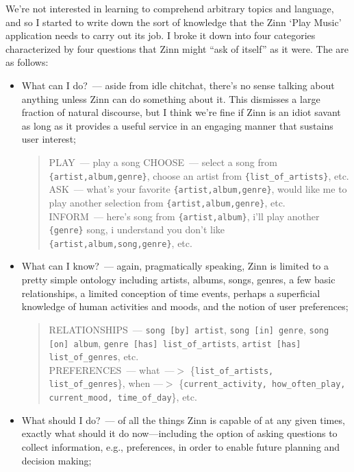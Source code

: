 \documentclass[letterpaper,11pt]{article}
\begin{document}
We're not interested in learning to comprehend arbitrary topics and language, and so I started to write down the sort of knowledge that the Zinn `Play Music' application needs to carry out its job. I broke it down into four categories characterized by four questions that Zinn might ``ask of itself'' as it were. The are as follows:
%
\begin{itemize}
%
\item What can I do?~--- aside from idle chitchat, there's no sense talking about anything unless Zinn can do something about it. This dismisses a large fraction of natural discourse, but I think we're fine if Zinn is an idiot savant as long as it provides a useful service in an engaging manner that sustains user interest; 
%
  \begin{quotation}
%
    \noindent
    PLAY~--- play a song
    CHOOSE~--- select a song from {\tt{\{artist,album,genre\}}}, choose an artist from {\tt{\{list\_of\_artists\}}}, etc.\\
    ASK~--- what's your favorite {\tt{\{artist,album,genre\}}}, would like me to play another selection from {\tt{\{artist,album,genre\}}}, etc.\\
    INFORM~--- here's song from {\tt{\{artist,album\}}}, i'll play another {\tt{\{genre\}}} song, i understand you don't like {\tt{\{artist,album,song,genre\}}}, etc.\\
%
  \end{quotation}
%
\item What can I know?~--- again, pragmatically speaking, Zinn is limited to a pretty simple ontology including artists, albums, songs, genres, a few basic relationships, a limited conception of time events, perhaps a superficial knowledge of human activities and moods, and the notion of user preferences;
%
  \begin{quotation}
%
    \noindent
    RELATIONSHIPS~--- {\tt{song [by] artist}}, {\tt{song [in] genre}}, {\tt{song [on] album}}, {\tt{genre [has] list\_of\_artists}}, {\tt{artist [has] list\_of\_genres}}, etc.\\
    PREFERENCES~--- what~---$>$ \{{\tt{list\_of\_artists, list\_of\_genres}}\}, when ---$>$ \{{\tt{current\_activity, how\_often\_play, current\_mood, time\_of\_day}}\}, etc.\\
%
  \end{quotation}
%
\item What should I do?~--- of all the things Zinn is capable of at any given times, exactly what should it do now---including the option of asking questions to collect information, e.g., preferences, in order to enable future planning and decision making;

\end{itemize}
\end{document}
